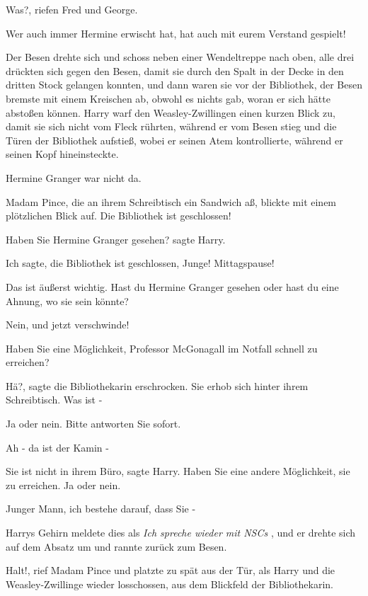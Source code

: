 \glqq{}Was?\grqq{}, riefen Fred und George.

\glqq{}Wer auch immer Hermine erwischt hat, hat auch mit eurem Verstand
gespielt!\grqq{}

Der Besen drehte sich und schoss neben einer Wendeltreppe nach oben, alle drei
drückten sich gegen den Besen, damit sie durch den Spalt in der Decke in den
dritten Stock gelangen konnten, und dann waren sie vor der Bibliothek, der Besen
bremste mit einem Kreischen ab, obwohl es nichts gab, woran er sich hätte
abstoßen können. Harry warf den Weasley-Zwillingen einen kurzen Blick zu, damit
sie sich nicht vom Fleck rührten, während er vom Besen stieg und die Türen der
Bibliothek aufstieß, wobei er seinen Atem kontrollierte, während er seinen Kopf
hineinsteckte.

Hermine Granger war nicht da.

Madam Pince, die an ihrem Schreibtisch ein Sandwich aß, blickte mit einem
plötzlichen Blick auf. \glqq{}Die Bibliothek ist geschlossen!\grqq{}

\glqq{}Haben Sie Hermine Granger gesehen?\grqq{} sagte Harry.

\glqq{}Ich sagte, die Bibliothek ist geschlossen, Junge! Mittagspause!\grqq{}

\glqq{}Das ist äußerst wichtig. Hast du Hermine Granger gesehen oder hast du eine
Ahnung, wo sie sein könnte?\grqq{}

\glqq{}Nein, und jetzt verschwinde!\grqq{}

\glqq{}Haben Sie eine Möglichkeit, Professor McGonagall im Notfall schnell zu
erreichen?\grqq{}

\glqq{}Hä?\grqq{}, sagte die Bibliothekarin erschrocken. Sie erhob sich hinter
ihrem Schreibtisch. \glqq{}Was ist -\grqq{}

\glqq{}Ja oder nein. Bitte antworten Sie sofort.\grqq{}

\glqq{}Ah - da ist der Kamin -\grqq{}

\glqq{}Sie ist nicht in ihrem Büro\grqq{}, sagte Harry. \glqq{}Haben Sie eine
andere Möglichkeit, sie zu erreichen. Ja oder nein.\grqq{}

\glqq{}Junger Mann, ich bestehe darauf, dass Sie -\grqq{}

Harrys Gehirn meldete dies als\emph{ \glqq{}Ich spreche wieder mit NSCs\grqq{}} ,
und er drehte sich auf dem Absatz um und rannte zurück zum Besen.

\glqq{}Halt!\grqq{}, rief Madam Pince und platzte zu spät aus der Tür, als Harry
und die Weasley-Zwillinge wieder losschossen, aus dem Blickfeld der
Bibliothekarin.


